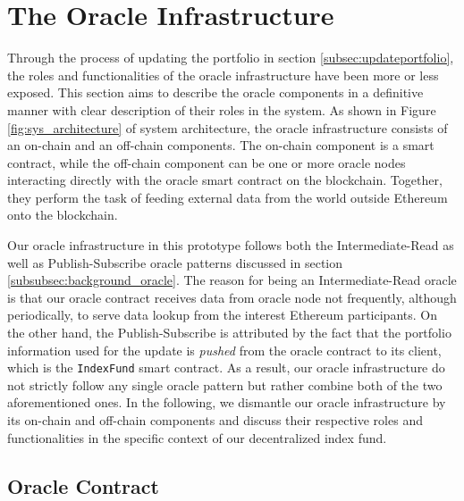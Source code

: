 \section{The Oracle Infrastructure} \label{sec:oracleinfras}

Through the process of updating the portfolio in section \ref{subsec:updateportfolio}, the roles and functionalities of the oracle infrastructure have been more or less exposed. This section aims to describe the oracle components in a definitive manner with clear description of their roles in the system. As shown in Figure \ref{fig:sys_architecture} of system architecture, the oracle infrastructure consists of an on-chain and an off-chain components. The on-chain component is a smart contract, while the off-chain component can be one or more oracle nodes interacting directly with the oracle smart contract on the blockchain. Together, they perform the task of feeding external data from the world outside Ethereum onto the blockchain.

Our oracle infrastructure in this prototype follows both the Intermediate-Read as well as Publish-Subscribe oracle patterns discussed in section \ref{subsubsec:background_oracle}. The reason for being an Intermediate-Read oracle is that our oracle contract receives data from oracle node not frequently, although periodically, to serve data lookup from the interest Ethereum participants. On the other hand, the Publish-Subscribe is attributed by the fact that the portfolio information used for the update is \textit{pushed} from the oracle contract to its client, which is the \texttt{IndexFund} smart contract. As a result, our oracle infrastructure do not strictly follow any single oracle pattern but rather combine both of the two aforementioned ones. In the following, we dismantle our oracle infrastructure by its on-chain and off-chain components and discuss their respective roles and functionalities in the specific context of our decentralized index fund.

\subsection{Oracle Contract}

